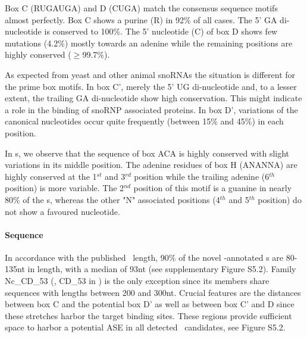 Box C (RUGAUGA) and D (CUGA) match the consensus sequence motifs
almost perfectly. Box C shows a purine (R) in 92\% of all cases.  The
5' GA di-nucleotide is conserved to 100\%.  The 5' nucleotide (C) of
box D shows few mutations (4.2\%) mostly towards an adenine while the
remaining positions are highly conserved ($\ge$99.7\%).

As expected from yeast and other animal snoRNAs the situation is
different for the prime box motifs.  In box C', merely the 5' UG
di-nucleotide and, to a lesser extent, the trailing GA di-nucleotide
show high conservation.  This might indicate a role in the binding of
snoRNP associated proteins.  In box D', variations of the canonical
nucleotides occur quite frequently (between 15\% and 45\%) in each
position.

In \haca s, we observe that the sequence of box ACA is highly
conserved with slight variations in its middle position. The adenine
residues of box H (ANANNA) are highly conserved at the 1$^{st}$ and
3$^{rd}$ position while the trailing adenine (6$^{th}$ position) is
more variable. The 2$^{nd}$ position of this motif is a guanine in
nearly 80\% of the \haca s, whereas the other "N" associated positions
(4$^{th}$ and 5$^{th}$ position) do not show a favoured nucleotide.

\paragraph{\textbf{Sequence}} In accordance with the published \cd\
length, 90\% of the novel \snostrip-annotated \sno s are 80-135nt in
length, with a median of 93nt (see supplementary Figure S5.2).  Family Nc\_CD\_53
(\ncr, CD\_53 in \snostrip) is the only exception since its members
share sequences with lengths between 200 and 300nt.  Crucial features
are the distances between box C and the potential box D' as well as
between box C' and D since these stretches harbor the target binding
sites. These regions provide sufficient space to harbor a potential ASE in all detected \sno\ candidates, see Figure S5.2.

